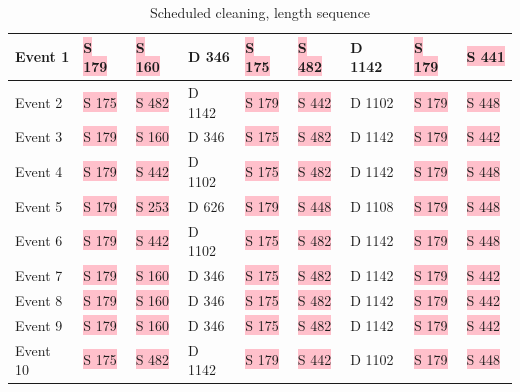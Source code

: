 \begin{table}[H]
\small
\centering
\caption{Scheduled cleaning, length sequence}
\label{tab:sclengthseq}
\begin{tabular}{|l|l|l|l|l|l|l|l|l|}
\hline
Event 1  & \colorbox{pink}{S 179} & \colorbox{pink}{S 160} & D 346  & \colorbox{pink}{S 175} & \colorbox{pink}{S 482} & D 1142 & \colorbox{pink}{S 179} & \colorbox{pink}{S 441} \\ \hline
Event 2  & \colorbox{pink}{S 175} & \colorbox{pink}{S 482} & D 1142 & \colorbox{pink}{S 179} & \colorbox{pink}{S 442} & D 1102 & \colorbox{pink}{S 179} & \colorbox{pink}{S 448}  \\ \hline
Event 3  & \colorbox{pink}{S 179} & \colorbox{pink}{S 160} & D 346  & \colorbox{pink}{S 175} & \colorbox{pink}{S 482} & D 1142 & \colorbox{pink}{S 179} & \colorbox{pink}{S 442}  \\ \hline
Event 4  & \colorbox{pink}{S 179} & \colorbox{pink}{S 442} & D 1102 & \colorbox{pink}{S 175} & \colorbox{pink}{S 482} & D 1142 & \colorbox{pink}{S 179} & \colorbox{pink}{S 448}  \\ \hline
Event 5  & \colorbox{pink}{S 179} & \colorbox{pink}{S 253} & D 626  & \colorbox{pink}{S 179} & \colorbox{pink}{S 448} & D 1108 & \colorbox{pink}{S 179} & \colorbox{pink}{S 448}  \\ \hline
Event 6  & \colorbox{pink}{S 179} & \colorbox{pink}{S 442} & D 1102 & \colorbox{pink}{S 175} & \colorbox{pink}{S 482} & D 1142 & \colorbox{pink}{S 179} & \colorbox{pink}{S 448}  \\ \hline
Event 7  & \colorbox{pink}{S 179} & \colorbox{pink}{S 160} & D 346  & \colorbox{pink}{S 175} & \colorbox{pink}{S 482} & D 1142 & \colorbox{pink}{S 179} & \colorbox{pink}{S 442}  \\ \hline
Event 8  & \colorbox{pink}{S 179} & \colorbox{pink}{S 160} & D 346  & \colorbox{pink}{S 175} & \colorbox{pink}{S 482} & D 1142 & \colorbox{pink}{S 179} & \colorbox{pink}{S 442}  \\ \hline
Event 9  & \colorbox{pink}{S 179} & \colorbox{pink}{S 160} & D 346  & \colorbox{pink}{S 175} & \colorbox{pink}{S 482} & D 1142 & \colorbox{pink}{S 179} & \colorbox{pink}{S 442}  \\ \hline
Event 10 & \colorbox{pink}{S 175} & \colorbox{pink}{S 482} & D 1142 & \colorbox{pink}{S 179} & \colorbox{pink}{S 442} & D 1102 & \colorbox{pink}{S 179} & \colorbox{pink}{S 448}  \\ \hline
\end{tabular}
\end{table}


